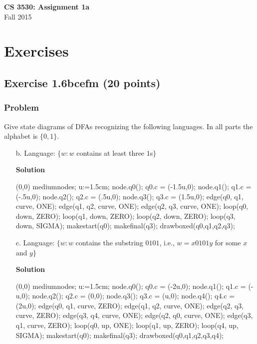 \documentclass{article}
\begin{document}
\begin{empfile}

\begin{center}
\textbf{\Large CS 3530: Assignment 1a} \\[2mm]
Fall 2015
\end{center}

\raggedright

\section*{Exercises}

\subsection*{Exercise 1.6bcefm (20 points)}

\subsubsection*{Problem}

Give state diagrams of DFAs recognizing the following languages. In
all parts the alphabet is $\{0,1\}$.

\begin{itemize}
\item[b.] Language: $\{w:w$ contains at least three $1$s$\}$

\textbf{Solution}
	\begin{center}
	\begin{emp}(0,0)
	mediumnodes;
	u:=1.5cm;
	node.q0(); q0.c = (-1.5u,0);
	node.q1(); q1.c = (-.5u,0);
	node.q2(); q2.c = (.5u,0);
	node.q3(); q3.c = (1.5u,0);
	edge(q0, q1, curve, ONE);
	edge(q1, q2, curve, ONE);
	edge(q2, q3, curve, ONE);
	loop(q0, down, ZERO);
	loop(q1, down, ZERO);
	loop(q2, down, ZERO);
	loop(q3, down, SIGMA);
	makestart(q0);
	makefinal(q3);
	drawboxed(q0,q1,q2,q3);
	\end{emp}
	\end{center}

\item[c.] Language: $\{w:w$ contains the substring $0101$, i.e., $w=x0101y$ for some $x$ and $y\}$

\textbf{Solution}
	\begin{center}
	\begin{emp}(0,0)
	mediumnodes;
	u:=1.5cm;
	node.q0(); q0.c = (-2u,0);
	node.q1(); q1.c = (-u,0);
	node.q2(); q2.c = (0,0);
	node.q3(); q3.c = (u,0);
	node.q4(); q4.c = (2u,0);
	edge(q0, q1, curve, ZERO);
	edge(q1, q2, curve, ONE);
	edge(q2, q3, curve, ZERO);
	edge(q3, q4, curve, ONE);
	edge(q2, q0, curve, ONE);
	edge(q3, q1, curve, ZERO);
	loop(q0, up, ONE);
	loop(q1, up, ZERO);
	loop(q4, up, SIGMA);
	makestart(q0);
	makefinal(q3);
	drawboxed(q0,q1,q2,q3,q4);
	\end{emp}
	\end{center}


\end{itemize}
\end{empfile}
\end{document}
